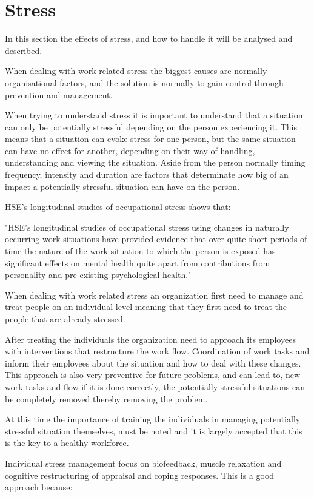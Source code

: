 \section{Stress}
In this section the effects of stress, and how to handle it will be analysed and described.

When dealing with work related stress the biggest causes are normally organisational factors, and the solution is normally to gain control through prevention and management.

When trying to understand stress it is important to understand that a situation can only be potentially stressful depending on the person experiencing it. This means that a situation can evoke stress for one person, but the same situation can have no effect for another, depending on their way of handling, understanding and viewing the situation. Aside from the person normally timing frequency, intensity and duration are factors that determinate how big of an impact a potentially stressful situation can have on the person.

HSE's longitudinal studies of occupational stress shows that:

"HSE's longitudinal studies of occupational stress using changes in naturally occurring work situations have provided evidence that over quite short periods of time the nature of the work situation to which the person is exposed has significant effects on mental health quite apart from contributions from personality and pre-existing psychological health."

When dealing with work related stress an organization first need to manage and treat people on an individual level meaning that they first need to treat the people that are already stressed\cite{control_stress_work}.

After treating the individuals the organization need to approach its employees with interventions that restructure the work flow. Coordination of work tasks and inform their employees about the situation and how to deal with these changes. This approach is also very preventive for future problems, and can lead to, new work tasks and flow if it is done correctly, the potentially stressful situations can be completely removed thereby removing the problem.

At this time the importance of training the individuals in managing potentially stressful situation themselves, must be noted and it is largely accepted that this is the key to a healthy workforce.

Individual stress management focus on biofeedback, muscle relaxation and cognitive restructuring of appraisal and coping responses. This is a good approach because:

